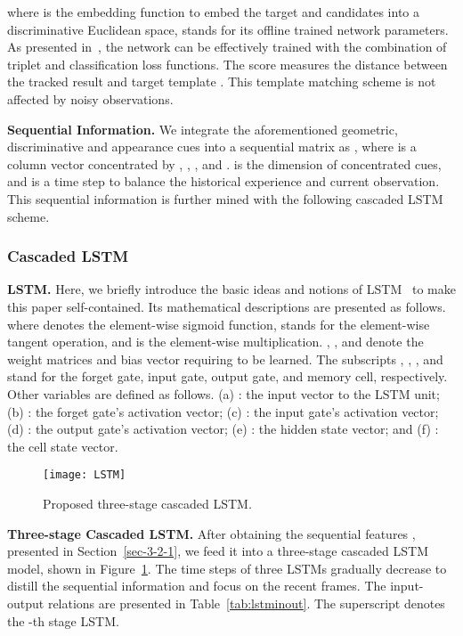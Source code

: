 \documentclass[10pt,twocolumn,letterpaper]{article}
\begin{document}
where  is the embedding function to embed the target
and candidates into a discriminative Euclidean space,  stands for its offline
trained network parameters.
As presented in~\cite{Luo2019}, the network 
can be effectively trained with the combination of triplet and classification loss functions.
The score  measures the distance between the tracked result  and target
template .
This template matching scheme is not affected by noisy observations.

\noindent \textbf{Sequential Information.}
We integrate the aforementioned geometric, discriminative and appearance cues into
a sequential matrix as
, where 
is a column vector concentrated by , , , and .
 is the dimension of concentrated cues, and  is a time step to balance the
historical experience and current observation.
This sequential information is further mined with the following cascaded LSTM scheme.
\vspace{-4mm}
\subsubsection{Cascaded LSTM}
\vspace{-2mm}
\noindent \textbf{LSTM.} Here, we briefly introduce the basic ideas and notions of
LSTM~\cite{LSTM} to make this paper self-contained.
Its mathematical descriptions are presented as follows.\\

where  denotes the element-wise sigmoid function,
 stands for the element-wise tangent operation,
and  is the element-wise multiplication.
, , and  denote the weight matrices and bias vector
requiring to be learned. The subscripts , , , and  stand for the forget gate, input
gate, output gate, and memory cell, respectively.
Other variables are defined as follows.
(a) : the input vector to the LSTM unit;
(b) : the forget gate's activation vector;
(c) : the input gate's activation vector;
(d) : the output gate's activation vector;
(e) : the hidden state vector;
and (f) : the cell state vector.

\begin{figure}[!t]
	\begin{center}
		\texttt{[image: LSTM]}
	\end{center}
	\vspace{-4mm}
	\caption{Proposed three-stage cascaded LSTM.}
	\label{fig-lstm}
	\vspace{-4mm}
\end{figure}

\noindent \textbf{Three-stage Cascaded LSTM.} After obtaining the sequential features
, presented in Section~\ref{sec-3-2-1}, we feed it into a three-stage
cascaded LSTM model, shown in Figure~\ref{fig-lstm}.
The time steps of three LSTMs gradually decrease to distill the sequential information
and focus on the recent frames.
The input-output relations are presented in Table~\ref{tab:lstminout}. The superscript 
denotes the -th stage LSTM.
\end{document}
